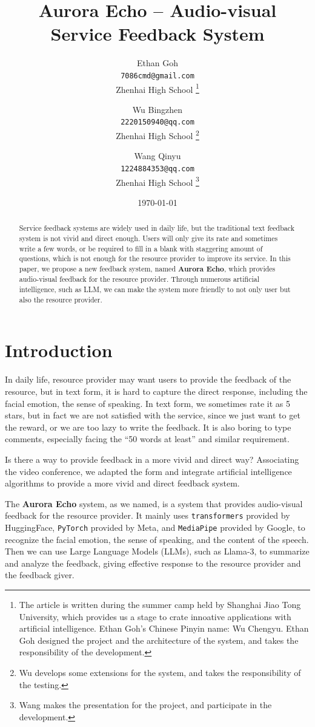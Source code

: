 \documentclass{article}
\title{Aurora Echo -- Audio-visual Service Feedback System}
\author{
    Ethan Goh \\ \texttt{7086cmd@gmail.com} \\ Zhenhai High School
        \thanks{The article is written during the summer camp held by Shanghai Jiao Tong University, which provides us a stage to crate innoative applications with artificial intelligence. Ethan Goh's Chinese Pinyin name: Wu Chengyu. Ethan Goh designed the project and the architecture of the system, and takes the responsibility of the development.}
    \and Wu Bingzhen \\ \texttt{2220150940@qq.com} \\ Zhenhai High School \thanks{Wu develops some extensions for the system, and takes the responsibility of the testing.}
    \and Wang Qinyu \\ \texttt{1224884353@qq.com} \\ Zhenhai High School \thanks{Wang makes the presentation for the project, and participate in the development.}
}
\date{\today}
\begin{document}
    \maketitle

    \begin{abstract}
        Service feedback systems are widely used in daily life, but the traditional text feedback system is not vivid and direct enough.
        Users will only give its rate and sometimes write a few words, or be required to fill in a blank with staggering amount of questions, which is not enough for the resource provider to improve its service.
        In this paper, we propose a new feedback system, named \textbf{Aurora Echo}, which provides audio-visual feedback for the resource provider.
        Through numerous artificial intelligence, such as LLM, we can make the system more friendly to not only user but also the resource provider.
    \end{abstract}

    \newpage

    \section{Introduction}\label{sec:intro}

    In daily life, resource provider may want users to provide the feedback of the resource\cite{åström2010feedback}, but in text form, it is hard to capture the direct response, including the facial emotion, the sense of speaking.
    In text form, we sometimes rate it as 5 stars, but in fact we are not satisfied with the service, since we just want to get the reward, or we are too lazy to write the feedback.
    It is also boring to type comments, especially facing the ``50 words at least'' and similar requirement.

    Is there a way to provide feedback in a more vivid and direct way?
    Associating the video conference, we adapted the form and integrate artificial intelligence algorithms to provide a more vivid and direct feedback system.

    The \textbf{Aurora Echo} system, as we named, is a system that provides audio-visual feedback for the resource provider.
    It mainly uses \texttt{transformers}\cite{DBLP:journals/corr/abs-1910-03771} provided by HuggingFace, \texttt{PyTorch}\cite{DBLP:journals/corr/abs-1912-01703} provided by Meta, and \texttt{MediaPipe}\cite{DBLP:journals/corr/abs-1906-08172} provided by Google, to recognize the facial emotion, the sense of speaking, and the content of the speech.
    Then we can use Large Language Models (LLMs), such as Llama-3, to summarize and analyze the feedback, giving effective response to the resource provider and the feedback giver.
\end{document}
